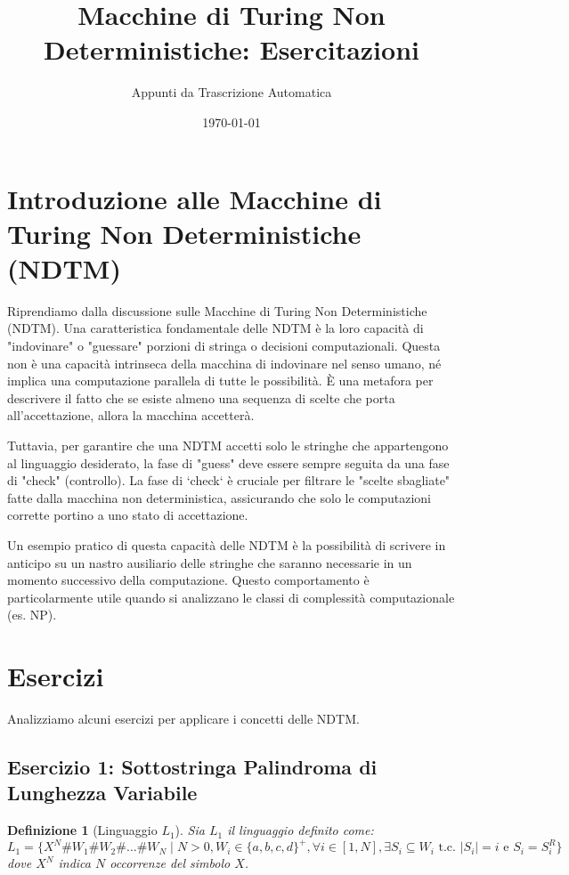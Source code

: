 \documentclass[a4paper]{article}
\title{Macchine di Turing Non Deterministiche: Esercitazioni}
\author{Appunti da Trascrizione Automatica}
\date{\today}
\newtheorem{definition}{Definizione}
\begin{document}
\maketitle
\tableofcontents
\newpage

\section{Introduzione alle Macchine di Turing Non Deterministiche (NDTM)}

Riprendiamo dalla discussione sulle Macchine di Turing Non Deterministiche (NDTM).
Una caratteristica fondamentale delle NDTM è la loro capacità di "indovinare" o "guessare" porzioni di stringa o decisioni computazionali. Questa non è una capacità intrinseca della macchina di indovinare nel senso umano, né implica una computazione parallela di tutte le possibilità. È una metafora per descrivere il fatto che se esiste almeno una sequenza di scelte che porta all'accettazione, allora la macchina accetterà.

Tuttavia, per garantire che una NDTM accetti solo le stringhe che appartengono al linguaggio desiderato, la fase di "guess" deve essere sempre seguita da una fase di "check" (controllo). La fase di `check` è cruciale per filtrare le "scelte sbagliate" fatte dalla macchina non deterministica, assicurando che solo le computazioni corrette portino a uno stato di accettazione.

Un esempio pratico di questa capacità delle NDTM è la possibilità di scrivere in anticipo su un nastro ausiliario delle stringhe che saranno necessarie in un momento successivo della computazione. Questo comportamento è particolarmente utile quando si analizzano le classi di complessità computazionale (es. NP).

\section{Esercizi}

Analizziamo alcuni esercizi per applicare i concetti delle NDTM.

\subsection{Esercizio 1: Sottostringa Palindroma di Lunghezza Variabile}

\begin{definition}[Linguaggio $L_1$]
Sia $L_1$ il linguaggio definito come:
$L_1 = \{ X^N \# W_1 \# W_2 \# \dots \# W_N \mid N > 0, W_i \in \{a,b,c,d\}^+, \forall i \in [1, N], \exists S_i \subseteq W_i \text{ t.c. } |S_i| = i \text{ e } S_i = S_i^R \}$
dove $X^N$ indica $N$ occorrenze del simbolo $X$.
\end{definition}
\end{document}
